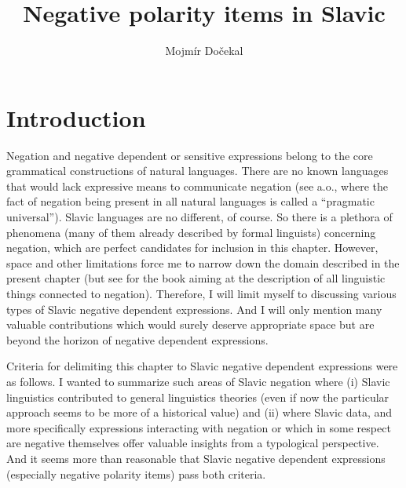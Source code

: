 \documentclass[output=paper,colorlinks,citecolor=brown]{langscibook}
\author{Mojmír Dočekal\orcid{0000-0002-9993-4756}\affiliation{Masaryk University} }
\title{Negative polarity items in Slavic}
\begin{document}
\maketitle


\section{Introduction\label{introduction}}

Negation and negative dependent or sensitive expressions belong to the core grammatical constructions of natural languages. There are no known languages that would lack expressive means to communicate negation (see \citealt{bernini2012negative} a.o., where the fact of negation being present in all natural languages is called a ``pragmatic universal''). Slavic languages are no different, of course. So there is a plethora of phenomena (many of them already described by formal linguists) concerning negation, which are perfect candidates for inclusion in this chapter. However, space and other limitations force me to narrow down the domain described in the present chapter (but see \citealt{horn1989} for the book aiming at the description of all linguistic things connected to negation). Therefore, I will limit myself to discussing various types of Slavic negative dependent expressions. And I will only mention many valuable contributions which would surely deserve appropriate space but are beyond the horizon of negative dependent expressions. 

Criteria for delimiting this chapter to Slavic negative dependent expressions were as follows. I wanted to summarize such areas of Slavic negation where (i) Slavic linguistics contributed to general linguistics theories (even if now the particular approach seems to be more of a historical value) and (ii) where Slavic data, and more specifically expressions interacting with negation or which in some respect are negative themselves offer valuable insights from a typological perspective. And it seems more than reasonable that Slavic negative dependent expressions (especially negative polarity items) pass both criteria.
\end{document}
